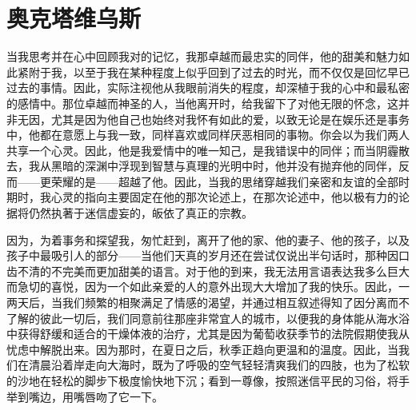 
\chapter{奥克塔维乌斯}



当我思考并在心中回顾我对的记忆，我那卓越而最忠实的同伴，他的甜美和魅力如此紧附于我，以至于我在某种程度上似乎回到了过去的时光，而不仅仅是回忆早已过去的事情。因此，实际注视他从我眼前消失的程度，却深植于我的心中和最私密的感情中。那位卓越而神圣的人，当他离开时，给我留下了对他无限的怀念，这并非无因，尤其是因为他自己也始终对我怀有如此的爱，以致无论是在娱乐还是事务中，他都在意愿上与我一致，同样喜欢或同样厌恶相同的事物。你会以为我们两人共享一个心灵。因此，他是我爱情中的唯一知己，是我错误中的同伴；而当阴霾散去，我从黑暗的深渊中浮现到智慧与真理的光明中时，他并没有抛弃他的同伴，反而——更荣耀的是——超越了他。因此，当我的思绪穿越我们亲密和友谊的全部时期时，我心灵的指向主要固定在他的那次论述上，在那次论述中，他以极有力的论据将仍然执著于迷信虚妄的，皈依了真正的宗教。\par


因为，为着事务和探望我，匆忙赶到，离开了他的家、他的妻子、他的孩子，以及孩子中最吸引人的部分——当他们天真的岁月还在尝试仅说出半句话时，那种因口齿不清的不完美而更加甜美的语言。对于他的到来，我无法用言语表达我多么巨大而急切的喜悦，因为一个如此亲爱的人的意外出现大大增加了我的快乐。因此，一两天后，当我们频繁的相聚满足了情感的渴望，并通过相互叙述得知了因分离而不了解的彼此一切后，我们同意前往那座非常宜人的城市，以便我的身体能从海水浴中获得舒缓和适合的干燥体液的治疗，尤其是因为葡萄收获季节的法院假期使我从忧虑中解脱出来。因为那时，在夏日之后，秋季正趋向更温和的温度。因此，当我们在清晨沿着岸走向大海时，既为了呼吸的空气轻轻清爽我们的四肢，也为了松软的沙地在轻松的脚步下极度愉快地下沉；看到一尊像，按照迷信平民的习俗，将手举到嘴边，用嘴唇吻了它一下。\par


